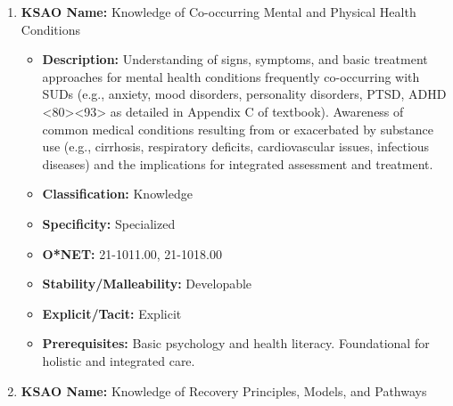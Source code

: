 \documentclass[
  letterpaper,
  DIV=11,
  numbers=noendperiod]{scrartcl}
\providecommand{\tightlist}{%
  \setlength{\itemsep}{0pt}\setlength{\parskip}{0pt}}
\begin{document}
\begin{enumerate}
  \begin{itemize}
  \tightlist
  \item
    \textbf{Description:} Familiarity with major categories of
    psychoactive substances (e.g., opioids, CNS depressants, stimulants,
    cannabis, hallucinogens, inhalants, dissociatives, nicotine, alcohol
    \textless80\textgreater\textless93\textgreater{} as detailed in
    Appendix B of textbook). Includes commercial/street names, forms,
    methods of administration, intoxication effects, short/long-term
    health effects, withdrawal syndromes, potential for
    medication-assisted treatment (MAT), and understanding of the
    Controlled Substances Act (CSA) and drug schedules.
  \item
    \textbf{Classification:} Knowledge
  \item
    \textbf{Specificity:} Specialized
  \item
    \textbf{O*NET:} 21-1011.00, 21-1018.00
  \item
    \textbf{Stability/Malleability:} Developable (requires ongoing
    learning)
  \item
    \textbf{Explicit/Tacit:} Explicit
  \item
    \textbf{Prerequisites:} Basic pharmacology understanding. Critical
    for assessment, crisis intervention, and client education.
  \end{itemize}
\item
  \textbf{KSAO Name:} Knowledge of Co-occurring Mental and Physical
  Health Conditions

  \begin{itemize}
  \tightlist
  \item
    \textbf{Description:} Understanding of signs, symptoms, and basic
    treatment approaches for mental health conditions frequently
    co-occurring with SUDs (e.g., anxiety, mood disorders, personality
    disorders, PTSD, ADHD
    \textless80\textgreater\textless93\textgreater{} as detailed in
    Appendix C of textbook). Awareness of common medical conditions
    resulting from or exacerbated by substance use (e.g., cirrhosis,
    respiratory deficits, cardiovascular issues, infectious diseases)
    and the implications for integrated assessment and treatment.
  \item
    \textbf{Classification:} Knowledge
  \item
    \textbf{Specificity:} Specialized
  \item
    \textbf{O*NET:} 21-1011.00, 21-1018.00
  \item
    \textbf{Stability/Malleability:} Developable
  \item
    \textbf{Explicit/Tacit:} Explicit
  \item
    \textbf{Prerequisites:} Basic psychology and health literacy.
    Foundational for holistic and integrated care.
  \end{itemize}
\item
  \textbf{KSAO Name:} Knowledge of Recovery Principles, Models, and
  Pathways


\end{enumerate}
\end{document}
